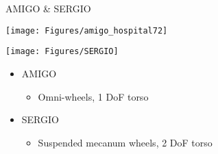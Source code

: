 \documentclass[a4paper,12pt]{article}
\newcommand{\emptylogo}{\texttt{[image: Figures/Empty]}}
\begin{document}
\begin{slidetop}


\begin{multicols}{2}

\begin{bclogo}[couleur = white, arrondi = 0.25, couleurBord = tuedarkblue, epBarre = 0, logo=\emptylogo]{\textcolor{tuedarkblue}{AMIGO \& SERGIO}}
\bigskip
\begin{minipage}[T]{0.48\linewidth}
	\begin{center}
		\texttt{[image: Figures/amigo\_hospital72]}
	\end{center}
\end{minipage}
\hfill
\begin{minipage}[T]{0.48\linewidth}
    \begin{center}
    	\texttt{[image: Figures/SERGIO]}
    \end{center}
\end{minipage}
    \begin{itemize}[itemsep = 0pt, parsep = 0pt, leftmargin=15pt]
    	\item AMIGO
    	\begin{itemize}[itemsep = 0pt, parsep = 0pt, leftmargin=15pt]
    		\item Omni-wheels, 1 DoF torso
    	\end{itemize}
    	\item SERGIO
    	\begin{itemize}[itemsep = 0pt, parsep = 0pt, leftmargin=15pt]
    		\item Suspended mecanum wheels, 2 DoF torso

\end{itemize}
\end{itemize}
\end{bclogo}
\end{multicols}
\end{slidetop}
\end{document}
